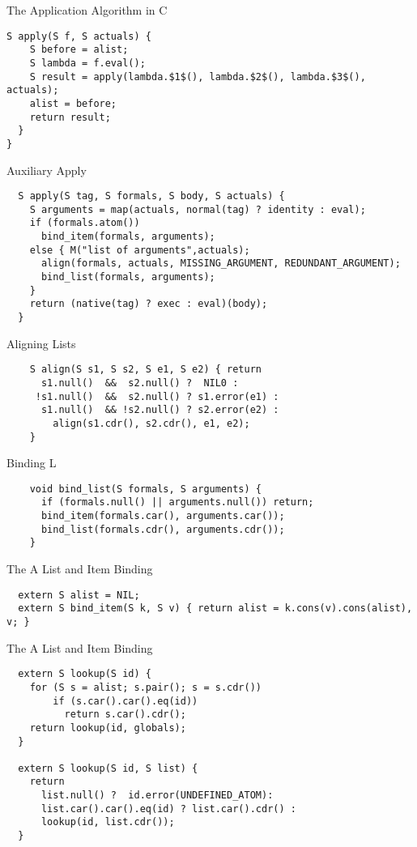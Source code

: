 \documentclass[aspectratio=169]{beamer}
\begin{document}
\begin{frame}[fragile]{The Application Algorithm in C}
\begin{verbatim}
S apply(S f, S actuals) {
    S before = alist;
    S lambda = f.eval(); 
    S result = apply(lambda.$1$(), lambda.$2$(), lambda.$3$(), actuals);
    alist = before;
    return result;
  }
}
\end{verbatim}
\end{frame}

\begin{frame}[fragile]{Auxiliary Apply}
\begin{verbatim}
  S apply(S tag, S formals, S body, S actuals) {
    S arguments = map(actuals, normal(tag) ? identity : eval);
    if (formals.atom())   
      bind_item(formals, arguments);
    else { M("list of arguments",actuals);
      align(formals, actuals, MISSING_ARGUMENT, REDUNDANT_ARGUMENT);
      bind_list(formals, arguments);
    }
    return (native(tag) ? exec : eval)(body);
  }
\end{verbatim}
\end{frame}

\begin{frame}[fragile]{Aligning Lists}
\begin{verbatim}
    S align(S s1, S s2, S e1, S e2) { return  
      s1.null()  &&  s2.null() ?  NIL0 : 
     !s1.null()  &&  s2.null() ? s1.error(e1) : 
      s1.null()  && !s2.null() ? s2.error(e2) : 
        align(s1.cdr(), s2.cdr(), e1, e2);  
    }
\end{verbatim}
\end{frame}

\begin{frame}[fragile]{Binding L}
\begin{verbatim}
    void bind_list(S formals, S arguments) {
      if (formals.null() || arguments.null()) return; 
      bind_item(formals.car(), arguments.car());
      bind_list(formals.cdr(), arguments.cdr());
    }
\end{verbatim}
\end{frame}

\begin{frame}[fragile]{The A List and Item Binding}
\begin{verbatim}
  extern S alist = NIL;
  extern S bind_item(S k, S v) { return alist = k.cons(v).cons(alist), v; }

\end{verbatim}
\end{frame}

\begin{frame}[fragile]{The A List and Item Binding}
\begin{verbatim}
  extern S lookup(S id) { 
    for (S s = alist; s.pair(); s = s.cdr())
        if (s.car().car().eq(id))
          return s.car().cdr(); 
    return lookup(id, globals); 
  } 
  
  extern S lookup(S id, S list) {
    return 
      list.null() ?  id.error(UNDEFINED_ATOM): 
      list.car().car().eq(id) ? list.car().cdr() : 
      lookup(id, list.cdr()); 
  }
\end{verbatim}
\end{frame}
\end{document}
